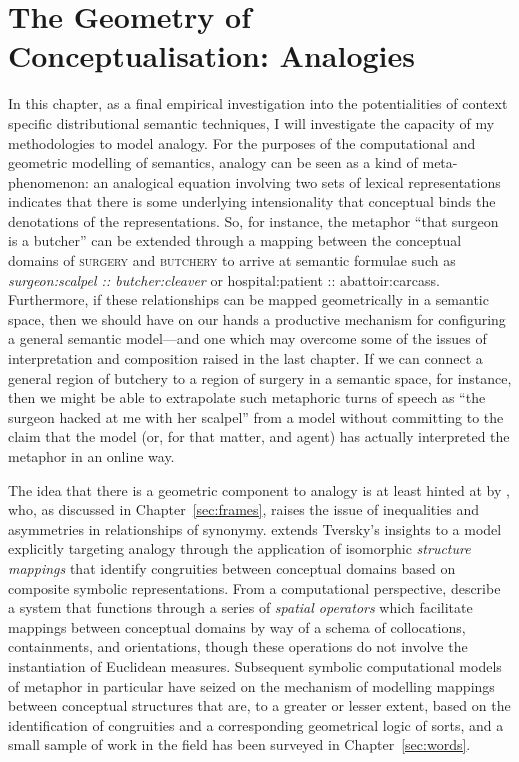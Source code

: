\chapter{The Geometry of Conceptualisation: Analogies} \label{chap:analogy}
In this chapter, as a final empirical investigation into the potentialities of context specific distributional semantic techniques, I will investigate the capacity of my methodologies to model analogy.  For the purposes of the computational and geometric modelling of semantics, analogy can be seen as a kind of meta-phenomenon: an analogical equation involving two sets of lexical representations indicates that there is some underlying intensionality that conceptual binds the denotations of the representations.  So, for instance, the metaphor ``that surgeon is a butcher'' can be extended through a mapping between the conceptual domains of \textsc{surgery} and \textsc{butchery} to arrive at semantic formulae such as \emph{surgeon:scalpel :: butcher:cleaver} or {hospital:patient :: abattoir:carcass}.  Furthermore, if these relationships can be mapped geometrically in a semantic space, then we should have on our hands a productive mechanism for configuring a general semantic model---and one which may overcome some of the issues of interpretation and composition raised in the last chapter.  If we can connect a general region of butchery to a region of surgery in a semantic space, for instance, then we might be able to extrapolate such metaphoric turns of speech as ``the surgeon hacked at me with her scalpel'' from a model without committing to the claim that the model (or, for that matter, and agent) has actually interpreted the metaphor in an online way.

The idea that there is a geometric component to analogy is at least hinted at by \cite{Tversky1977}, who, as discussed in Chapter~\ref{sec:frames}, raises the issue of inequalities and asymmetries in relationships of synonymy.  \cite{Gentner1983} extends Tversky's insights to a model explicitly targeting analogy through the application of isomorphic \emph{structure mappings} that identify congruities between conceptual domains based on composite symbolic representations.  From a computational perspective, \cite{VealeEA1992} describe a system that functions through a series of \emph{spatial operators} which facilitate mappings between conceptual domains by way of a schema of collocations, containments, and orientations, though these operations do not involve the instantiation of Euclidean measures.  Subsequent symbolic computational models of metaphor in particular have seized on the mechanism of modelling mappings between conceptual structures that are, to a greater or lesser extent, based on the identification of congruities and a corresponding geometrical logic of sorts, and a small sample of work in the field has been surveyed in Chapter~\ref{sec:words}.

